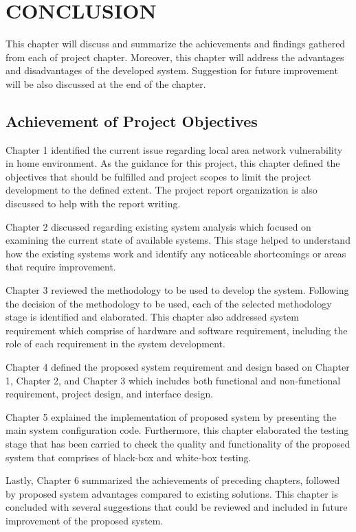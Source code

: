 \documentclass[../index.tex]{subfiles}
\begin{document}
\chapter{CONCLUSION}

This chapter will discuss and summarize the achievements and findings gathered from each of project
chapter. Moreover, this chapter will address the advantages and disadvantages of the developed
system. Suggestion for future improvement will be also discussed at the end of the chapter.

\section{Achievement of Project Objectives}

Chapter 1 identified the current issue regarding local area network vulnerability in home
environment. As the guidance for this project, this chapter defined the objectives that should be
fulfilled and project scopes to limit the project development to the defined extent. The project
report organization is also discussed to help with the report writing.

Chapter 2 discussed regarding existing system analysis which focused on examining the current state
of available systems. This stage helped to understand how the existing systems work and identify any
noticeable shortcomings or areas that require improvement.

Chapter 3 reviewed the methodology to be used to develop the system. Following the decision of the
methodology to be used, each of the selected methodology stage is identified and elaborated. This
chapter also addressed system requirement which comprise of hardware and software requirement,
including the role of each requirement in the system development.

Chapter 4 defined the proposed system requirement and design based on Chapter 1, Chapter 2, and
Chapter 3 which includes both functional and non-functional requirement, project design, and
interface design.

Chapter 5 explained the implementation of proposed system by presenting the main system
configuration code. Furthermore, this chapter elaborated the testing stage that has been carried to
check the quality and functionality of the proposed system that comprises of black-box and white-box
testing.

Lastly, Chapter 6 summarized the achievements of preceding chapters, followed by proposed system
advantages compared to existing solutions. This chapter is concluded with several suggestions that
could be reviewed and included in future improvement of the proposed system.
\end{document}

